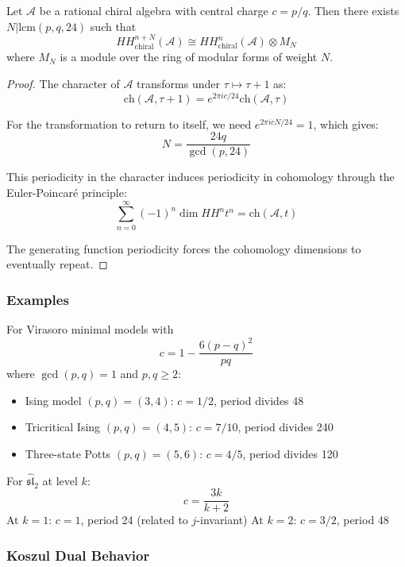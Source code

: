 \begin{theorem}
Let $\mathcal{A}$ be a rational chiral algebra with central charge $c = p/q$. Then there exists $N | \text{lcm}(p,q,24)$ such that
\[
HH^{n+N}_{\text{chiral}}(\mathcal{A}) \cong HH^n_{\text{chiral}}(\mathcal{A}) \otimes M_N
\]
where $M_N$ is a module over the ring of modular forms of weight $N$.
\end{theorem}

\begin{proof}
The character of $\mathcal{A}$ transforms under $\tau \mapsto \tau + 1$ as:
\[
\text{ch}(\mathcal{A}, \tau+1) = e^{2\pi i c/24} \text{ch}(\mathcal{A}, \tau)
\]

For the transformation to return to itself, we need $e^{2\pi i cN/24} = 1$, which gives:
\[
N = \frac{24q}{\gcd(p,24)}
\]

This periodicity in the character induces periodicity in cohomology through the Euler-Poincaré principle:
\[
\sum_{n=0}^{\infty} (-1)^n \dim HH^n t^n = \text{ch}(\mathcal{A}, t)
\]

The generating function periodicity forces the cohomology dimensions to eventually repeat.
\end{proof}

\subsubsection{Examples}

\begin{example}
For Virasoro minimal models with 
\[
c = 1 - \frac{6(p-q)^2}{pq}
\]
where $\gcd(p,q) = 1$ and $p,q \geq 2$:

\begin{itemize}
\item Ising model $(p,q) = (3,4)$: $c = 1/2$, period divides 48
\item Tricritical Ising $(p,q) = (4,5)$: $c = 7/10$, period divides 240  
\item Three-state Potts $(p,q) = (5,6)$: $c = 4/5$, period divides 120
\end{itemize}
\end{example}

\begin{example}
For $\widehat{\mathfrak{sl}}_2$ at level $k$:
\[
c = \frac{3k}{k+2}
\]
At $k=1$: $c = 1$, period 24 (related to $j$-invariant)
At $k=2$: $c = 3/2$, period 48
\end{example}

\subsubsection{Koszul Dual Behavior}

